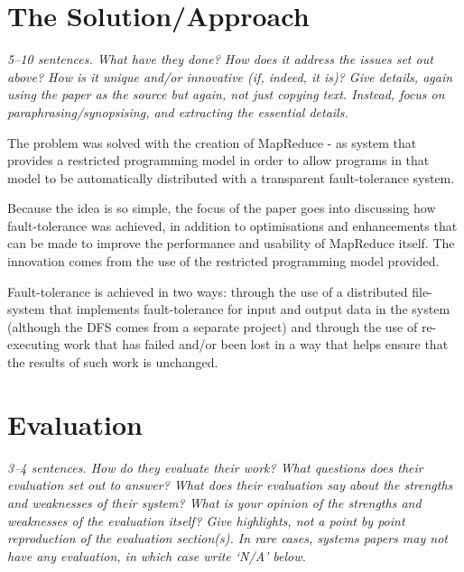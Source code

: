 \documentclass[11pt]{article}
\begin{document}
\section*{The Solution/Approach}

\textsl{5--10 sentences. What have they done? How does it address the issues
set out above? How is it unique and/or innovative (if, indeed, it is)? Give
details, again using the paper as the source but again, not just copying text.
Instead, focus on paraphrasing/synopsising, and extracting the essential
details.}

The problem was solved with the creation of MapReduce - as system that provides
a restricted programming model in order to allow programs in that model to be
automatically distributed with a transparent fault-tolerance system.

Because the idea is so simple, the focus of the paper goes into discussing how
fault-tolerance was achieved, in addition to optimisations and enhancements
that can be made to improve the performance and usability of MapReduce itself.
The innovation comes from the use of the restricted programming model provided.

Fault-tolerance is achieved in two ways: through the use of a distributed
file-system that implements fault-tolerance for input and output data in the
system (although the DFS comes from a separate project) and through the use of
re-executing work that has failed and/or been lost in a way that helps ensure
that the results of such work is unchanged.

\section*{Evaluation}

\textsl{3--4 sentences. How do they evaluate their work? What questions does
their evaluation set out to answer? What does their evaluation say about the
strengths and weaknesses of their system? What is your opinion of the strengths
and weaknesses of the evaluation itself? Give highlights, not a point by point
reproduction of the evaluation section(s). In rare cases, systems papers may
not have any evaluation, in which case write `N/A' below.}
\end{document}
